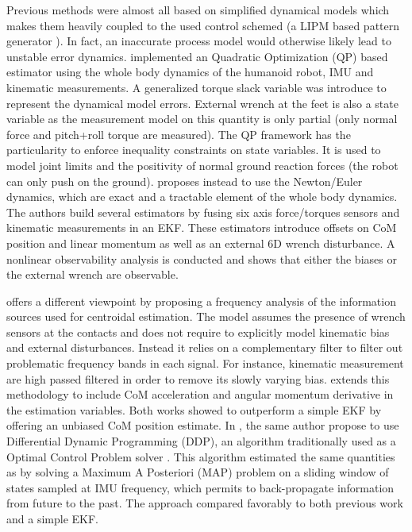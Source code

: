 Previous methods were almost all based on simplified dynamical models which makes them heavily coupled to the used control schemed (a LIPM based pattern generator \cite{kajita20013d}). 
In fact, an inaccurate process model would otherwise likely lead to unstable error dynamics. 
\cite{xinjilefu2014dynamic} implemented an Quadratic Optimization (QP) based estimator using the whole body dynamics
of the humanoid robot, IMU and kinematic measurements. A generalized torque slack variable was introduce to represent the dynamical model errors. 
External wrench at the feet is also a state variable as the measurement model on this quantity is only partial (only normal force and pitch+roll torque are measured). 
The QP framework has the particularity to enforce inequality constraints on state variables. It is used to model joint limits and the positivity of normal ground reaction forces 
(the robot can only push on the ground).
\cite{rotella2015humanoid} proposes instead to use the Newton/Euler dynamics, which are exact and a tractable element of the whole body dynamics. 
The authors build several estimators by fusing six axis force/torques sensors and kinematic measurements in an EKF. 
These estimators introduce offsets on CoM position and linear momentum as well as an external 6D wrench disturbance. A nonlinear observability analysis is conducted 
and shows that either the biases or the external wrench are observable. 

\cite{carpentier2016center} offers a different viewpoint by proposing a frequency analysis of the information sources used for centroidal estimation. The model
assumes the presence of wrench sensors at the contacts and does not require to explicitly model kinematic bias and external disturbances. Instead it relies on a complementary filter
to filter out problematic frequency bands in each signal. For instance, kinematic measurement are high passed filtered in order to remove its slowly varying bias. 
\cite{bailly2019recursive} extends this methodology to include CoM acceleration and angular momentum derivative in the estimation variables. Both works showed to outperform
a simple EKF by offering an unbiased CoM position estimate.
In \cite{bailly2021optimal}, the same author propose to use Differential Dynamic Programming (DDP), an algorithm traditionally used as a Optimal Control Problem solver \cite{mastalli2020crocoddyl}.
This algorithm estimated the same quantities as \cite{bailly2019recursive} by solving a Maximum A Posteriori (MAP) problem on a sliding window of states sampled at IMU frequency, 
which permits to back-propagate information from future to the past. The approach compared favorably to both previous work \cite{bailly2019recursive} and a simple EKF.





